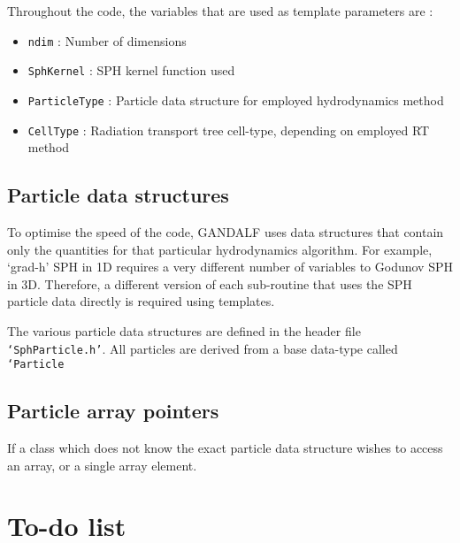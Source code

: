 \documentclass[a4paper]{article}
\newcommand{\var}[1]{\texttt{#1}}
\begin{document}
Throughout the code, the variables that are used as template parameters are :
\begin{itemize}
\item \var{ndim} : Number of dimensions
\item \var{SphKernel} : SPH kernel function used
\item \var{ParticleType} : Particle data structure for employed hydrodynamics method
\item \var{CellType} : Radiation transport tree cell-type, depending on employed RT method
\end{itemize}


\subsection{Particle data structures}

To optimise the speed of the code, GANDALF uses data structures that contain only the quantities for that particular hydrodynamics algorithm.  For example, `grad-h' SPH in 1D requires a very different number of variables to Godunov SPH in 3D.  Therefore, a different version of each sub-routine that uses the SPH particle data directly is required using templates.

The various particle data structures are defined in the header file \var{`SphParticle.h'}.  All particles are derived from a base data-type called \var{`Particle}




\subsection{Particle array pointers}

If a class which does not know the exact particle data structure wishes to access an array, or a single array element.



\newpage


\section{To-do list}
\end{document}
